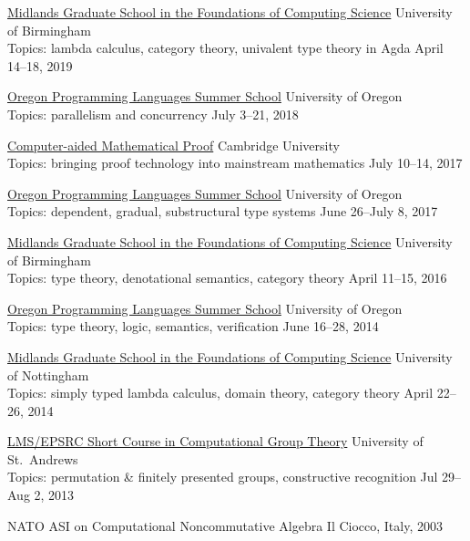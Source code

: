 \newcommand\ssitem[5]{\href{#1}{#2} \hfill #3 \\ Topics: #4 \hfill #5}

\ssitem
    {http://events.cs.bham.ac.uk/mgs2019/}
    {Midlands Graduate School in the Foundations of Computing Science}
    {University of Birmingham}
    {lambda calculus, category theory, univalent type theory in Agda}
    {April 14--18, 2019}

    \vspace{-3mm}

\ssitem
    {https://www.cs.uoregon.edu/research/summerschool/summer18/topics.php}
    {Oregon Programming Languages Summer School}
    {University of Oregon}
    {parallelism and concurrency}
    {July 3--21, 2018}

    \vspace{-3mm}

\ssitem
    {https://www.newton.ac.uk/event/bprw01}
    {Computer-aided Mathematical Proof}
    {Cambridge University}
    {bringing proof technology into mainstream mathematics}
    {July 10--14, 2017}
    
    \vspace{-3mm}

    \ssitem
    {https://www.cs.uoregon.edu/research/summerschool/summer17}
    {Oregon Programming Languages Summer School}
    {University of Oregon}
    {dependent, gradual, substructural type systems}
    {June 26--July 8, 2017}

    \vspace{-3mm}


    \ssitem
    {http://www.cs.bham.ac.uk/~pbl/mgs2016/}
    {Midlands Graduate School in the Foundations of Computing Science}
    {University of Birmingham}
    {type theory, denotational semantics, category theory}
    {April 11--15, 2016}

    \vspace{-3mm}

    \ssitem
    {https://www.cs.uoregon.edu/research/summerschool/summer14/curriculum.html}
    {Oregon Programming Languages Summer School}
    {University of Oregon}
    {type theory, logic, semantics, verification}
    {June 16--28, 2014}

    \vspace{-3mm}

\ssitem
    {http://www.cs.nott.ac.uk/~psztxa/mgs.2014/}
    {Midlands Graduate School in the Foundations of Computing Science}
    { University of Nottingham }
    {simply typed lambda calculus, domain theory, category theory}
    {April 22--26, 2014}

    \vspace{-3mm}

\ssitem
    {http://www-circa.mcs.st-and.ac.uk/cgt2013/}
    {LMS/EPSRC Short Course in Computational Group Theory}
    {University of St.~Andrews}
    {permutation \& finitely presented groups, constructive recognition}
    {Jul 29--Aug 2, 2013}

    \vspace{-3mm}

    NATO  ASI on Computational Noncommutative Algebra
           \hfill Il Ciocco, Italy, 2003 
